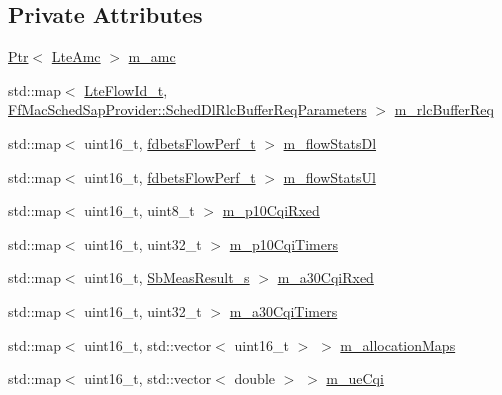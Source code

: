 \subsection*{Private Attributes}
\begin{DoxyCompactItemize}
\item 
\hyperlink{classns3_1_1Ptr}{Ptr}$<$ \hyperlink{classns3_1_1LteAmc}{Lte\+Amc} $>$ \hyperlink{classns3_1_1FdBetFfMacScheduler_ab6734e88a03f8d5085607802a0b49bbb}{m\+\_\+amc}
\item 
std\+::map$<$ \hyperlink{structns3_1_1LteFlowId__t}{Lte\+Flow\+Id\+\_\+t}, \hyperlink{structns3_1_1FfMacSchedSapProvider_1_1SchedDlRlcBufferReqParameters}{Ff\+Mac\+Sched\+Sap\+Provider\+::\+Sched\+Dl\+Rlc\+Buffer\+Req\+Parameters} $>$ \hyperlink{classns3_1_1FdBetFfMacScheduler_a77bc6d5b9a64164f6974cc8d8b0318c0}{m\+\_\+rlc\+Buffer\+Req}
\item 
std\+::map$<$ uint16\+\_\+t, \hyperlink{structns3_1_1fdbetsFlowPerf__t}{fdbets\+Flow\+Perf\+\_\+t} $>$ \hyperlink{classns3_1_1FdBetFfMacScheduler_a347c3f4c314a6791eef27d768927392a}{m\+\_\+flow\+Stats\+Dl}
\item 
std\+::map$<$ uint16\+\_\+t, \hyperlink{structns3_1_1fdbetsFlowPerf__t}{fdbets\+Flow\+Perf\+\_\+t} $>$ \hyperlink{classns3_1_1FdBetFfMacScheduler_ab32cc321792e04b643a0c976d79ba8b6}{m\+\_\+flow\+Stats\+Ul}
\item 
std\+::map$<$ uint16\+\_\+t, uint8\+\_\+t $>$ \hyperlink{classns3_1_1FdBetFfMacScheduler_a122fbac27516524b54245db095d9162c}{m\+\_\+p10\+Cqi\+Rxed}
\item 
std\+::map$<$ uint16\+\_\+t, uint32\+\_\+t $>$ \hyperlink{classns3_1_1FdBetFfMacScheduler_ab8a2a1181e0beecba1ec83576b9ff043}{m\+\_\+p10\+Cqi\+Timers}
\item 
std\+::map$<$ uint16\+\_\+t, \hyperlink{structns3_1_1SbMeasResult__s}{Sb\+Meas\+Result\+\_\+s} $>$ \hyperlink{classns3_1_1FdBetFfMacScheduler_ab5e71846932710964119a81bccdbd602}{m\+\_\+a30\+Cqi\+Rxed}
\item 
std\+::map$<$ uint16\+\_\+t, uint32\+\_\+t $>$ \hyperlink{classns3_1_1FdBetFfMacScheduler_a8a887ae2aea7f983bb40f3effd776c25}{m\+\_\+a30\+Cqi\+Timers}
\item 
std\+::map$<$ uint16\+\_\+t, std\+::vector$<$ uint16\+\_\+t $>$ $>$ \hyperlink{classns3_1_1FdBetFfMacScheduler_a4263d235edb72f1e37dc659586eb0253}{m\+\_\+allocation\+Maps}
\item 
std\+::map$<$ uint16\+\_\+t, std\+::vector$<$ double $>$ $>$ \hyperlink{classns3_1_1FdBetFfMacScheduler_a8cb7a6ccbbc1ee0a6dd2872cdc9d131e}{m\+\_\+ue\+Cqi}

\end{DoxyCompactItemize}
